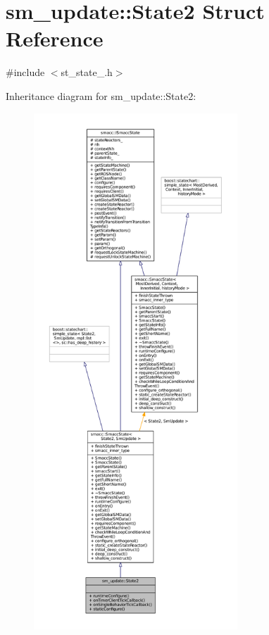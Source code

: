 \hypertarget{structsm__update_1_1State2}{}\section{sm\+\_\+update\+:\+:State2 Struct Reference}
\label{structsm__update_1_1State2}


{\ttfamily \#include $<$st\+\_\+state\+\_.\+h$>$}



Inheritance diagram for sm\+\_\+update\+:\+:State2\+:
\nopagebreak
\begin{figure}[H]
\begin{center}
\leavevmode
\includegraphics[height=550pt]{structsm__update_1_1State2__inherit__graph}
\end{center}
\end{figure}


